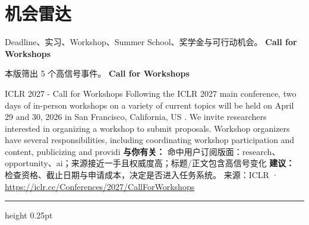 \documentclass[10.5pt]{ctexart}
\begin{document}
\section*{机会雷达}
{\color{ormuted} Deadline、实习、Workshop、Summer School、奖学金与可行动机会。}
\vspace{2mm}
{\LARGE\bfseries Call for Workshops}\par
\vspace{1mm}
{\color{ormuted} 本版筛出 5 个高信号事件。}
\vspace{3mm}
{\Large\bfseries Call for Workshops}\par
ICLR 2027 - Call for Workshops Following the ICLR 2027 main conference, two days of in-person workshops on a variety of current topics will be held on April 29 and 30, 2026 in San Francisco, California, US . We invite researchers interested in organizing a workshop to submit proposals. Workshop organizers have several responsibilities, including coordinating workshop participation and content, publicizing and providi
\textbf{与你有关：} 命中用户订阅版面：research、opportunity、ai；来源接近一手且权威度高；标题/正文包含高信号变化
\textbf{建议：} 检查资格、截止日期与申请成本，决定是否进入任务系统。
{\footnotesize\color{ormuted} 来源：ICLR · \url{https://iclr.cc/Conferences/2027/CallForWorkshops}}
\vspace{4mm}
\hrule height 0.25pt
\vspace{3mm}
\end{document}
